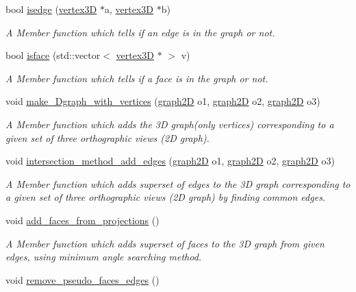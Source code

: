 \begin{DoxyCompactItemize}
bool \hyperlink{classgraph3D_ac73a37d6b631a9ae96ab6822cf73c11f}{isedge} (\hyperlink{classvertex3D}{vertex3D} $\ast$a, \hyperlink{classvertex3D}{vertex3D} $\ast$b)
\begin{DoxyCompactList}\small\item\em A Member function which tells if an edge is in the graph or not. \end{DoxyCompactList}\item 
bool \hyperlink{classgraph3D_a30171eb80bcfeb866667964dcaf8f8a6}{isface} (std\+::vector$<$ \hyperlink{classvertex3D}{vertex3D} $\ast$ $>$ v)
\begin{DoxyCompactList}\small\item\em A Member function which tells if a face is in the graph or not. \end{DoxyCompactList}\item 
void \hyperlink{classgraph3D_aa9c7ef09439ee3f7433f80f1ec4798ba}{make\+\_\+Dgraph\+\_\+with\+\_\+vertices} (\hyperlink{classgraph2D}{graph2D} o1, \hyperlink{classgraph2D}{graph2D} o2, \hyperlink{classgraph2D}{graph2D} o3)
\begin{DoxyCompactList}\small\item\em A Member function which adds the 3D graph(only vertices) corresponding to a given set of three orthographic views (2D graph). \end{DoxyCompactList}\item 
void \hyperlink{classgraph3D_a4d45444d8a38ab79394a2e84b0b2e692}{intersection\+\_\+method\+\_\+add\+\_\+edges} (\hyperlink{classgraph2D}{graph2D} o1, \hyperlink{classgraph2D}{graph2D} o2, \hyperlink{classgraph2D}{graph2D} o3)
\begin{DoxyCompactList}\small\item\em A Member function which adds superset of edges to the 3D graph corresponding to a given set of three orthographic views (2D graph) by finding common edges. \end{DoxyCompactList}\item 
void \hyperlink{classgraph3D_aa79b2b133574a9ae324bc14f0d48fc02}{add\+\_\+faces\+\_\+from\+\_\+projections} ()
\begin{DoxyCompactList}\small\item\em A Member function which adds superset of faces to the 3D graph from given edges, using minimum angle searching method. \end{DoxyCompactList}\item 
void \hyperlink{classgraph3D_aab83b82e5b746bd6c380d82b24f09de5}{remove\+\_\+pseudo\+\_\+faces\+\_\+edges} ()

\end{DoxyCompactItemize}
